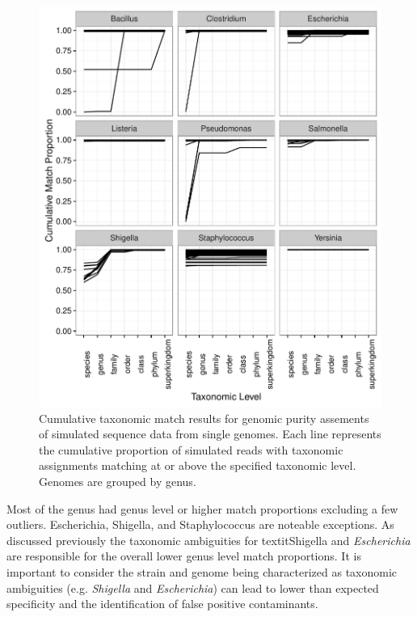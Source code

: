 \documentclass[fleqn,10pt,lineno]{wlpeerj}\usepackage[]{graphicx}\usepackage[]{color}
\makeatletter
\def\maxwidth{ %
  \ifdim\Gin@nat@width>\linewidth
    \linewidth
  \else
    \Gin@nat@width
  \fi
}
\newenvironment{knitrout}{}{} %
\makeatother
\begin{document}
\begin{knitrout}
\color{fgcolor}\begin{figure}

{\centering \includegraphics[width=\maxwidth]{figure/single_cum_plot-1} 

}

\caption[Cumulative taxonomic match results for genomic purity assements of simulated sequence data from single genomes]{Cumulative taxonomic match results for genomic purity assements of simulated sequence data from single genomes.  Each line represents the cumulative proportion of simulated reads with taxonomic assignments matching at or above the specified taxonomic level. Genomes are grouped by genus.}\label{fig:single_cum_plot}
\end{figure}


\end{knitrout}


Most of the genus had genus level or higher match proportions excluding a few outliers. 
Escherichia, Shigella, and Staphylococcus are noteable exceptions. 
As discussed previously the taxonomic ambiguities for
textit{Shigella} and \textit{Escherichia} are responsible for the overall lower genus level match proportions. 
It is important to consider the strain and genome being characterized as taxonomic ambiguities (e.g. \textit{Shigella} and \textit{Escherichia}) can lead to lower than expected specificity and the identification of false positive contaminants.  
\end{document}
